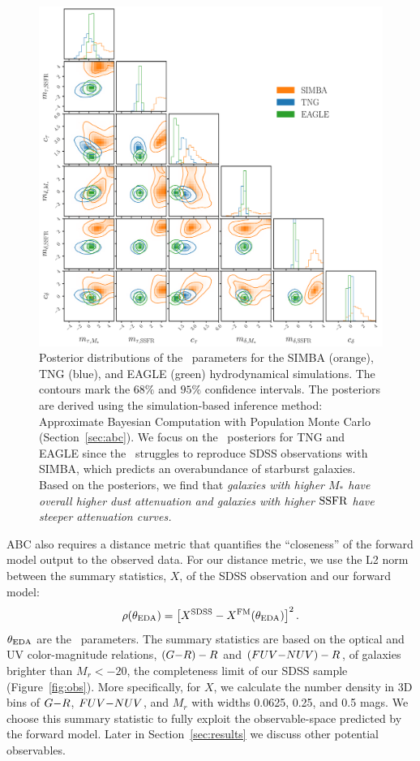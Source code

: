 \begin{figure}
\begin{center}
    \includegraphics[width=\textwidth]{figs/abc.pdf}
    \caption{\label{fig:abc}
    Posterior distributions of the \eda~parameters for the SIMBA (orange), TNG
    (blue), and EAGLE (green) hydrodynamical simulations. The contours mark the $68\%$
    and $95\%$ confidence intervals. The posteriors are derived using the
    simulation-based inference method: Approximate Bayesian Computation with Population Monte Carlo
    (Section~\ref{sec:abc}). We focus on the \eda~posteriors for TNG and EAGLE
    since the \eda~struggles to reproduce SDSS observations with SIMBA, which
    predicts an overabundance of starburst galaxies. Based on the posteriors, we find that \emph{galaxies with higher
    $M_*$ have overall higher dust attenuation and galaxies with higher ${\rm SSFR}$
    have steeper attenuation curves.}
    }
\end{center}
\end{figure}


ABC also requires a distance metric that quantifies the ``closeness'' of the
forward model output to the observed data. For our distance metric, we use the
L2 norm between the summary statistics, $X$, of the SDSS observation and our 
forward model: 
\begin{equation} \label{eq:distance}
    \rho(\theta_{\rm \eda}) = \left[X^{\rm SDSS} - X^{\rm FM}(\theta_{\rm
    \eda}) \right]^2.
\end{equation}
$\theta_{\rm EDA}$ are the \eda~parameters. 
The summary statistics are based on the optical and UV color-magnitude
relations, $(G{-}R)-R$ and $(FUV{-}NUV)-R$, of galaxies brighter than $M_r < -20$,
the completeness limit of our SDSS sample (Figure~\ref{fig:obs}).
More specifically, for $X$, we calculate the number density in 3D bins of $G{-}R$,
$FUV{-}NUV$, and $M_r$ with widths 0.0625, 0.25, and 0.5 mags. We choose this summary 
statistic to fully exploit the observable-space predicted by the forward model. 
Later in Section~\ref{sec:results} we discuss other potential observables. 

